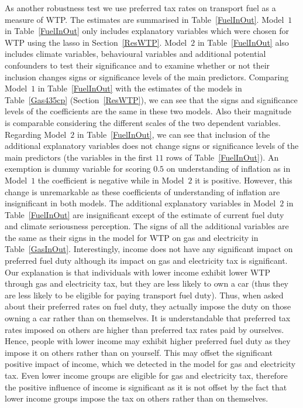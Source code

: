 \documentclass[a4paper,12pt]{article}
\begin{document}
As another robustness test we use preferred tax rates on transport fuel as a measure of WTP. The estimates are summarised in Table~\ref{FuelInOut}. Model~$1$ in Table~\ref{FuelInOut} only includes explanatory variables which were chosen for WTP using the lasso in Section~\ref{ResWTP}. Model~$2$ in Table~\ref{FuelInOut} also includes climate variables, behavioural variables and additional potential confounders to test their significance and to examine whether or not their inclusion changes signs or significance levels of the main predictors. Comparing Model~$1$ in Table~\ref{FuelInOut} with the estimates of the models in Table~\ref{Gas435cp} (Section~\ref{ResWTP}), we can see that the signs and significance levels of the coefficients are the same in these two models. Also their magnitude is comparable considering the different scales of the two dependent variables. Regarding Model~$2$ in Table~\ref{FuelInOut}, we can see that inclusion of the additional explanatory variables does not change signs or significance levels of the main predictors (the variables in the first $11$ rows of Table~\ref{FuelInOut}). An exemption is dummy variable for scoring $0.5$ on understanding of inflation as in Model~$1$ the coefficient is negative while in Model~$2$ it is positive. However, this change is unremarkable as these coefficients of understanding of inflation are insignificant in both models. The additional explanatory variables in Model~$2$ in Table~\ref{FuelInOut} are insignificant except of the estimate of current fuel duty and climate seriousness perception. The signs of all the additional variables are the same as their signs in the model for WTP on gas and electricity in Table~\ref{GasInOut}. Interestingly, income does not have any significant impact on preferred fuel duty although its impact on gas and electricity tax is significant. Our explanation is that individuals with lower income exhibit lower WTP through gas and electricity tax, but they are less likely to own a car (thus they are less likely to be eligible for paying transport fuel duty). Thus, when asked about their preferred rates on fuel duty, they actually impose the duty on those owning a car rather than on themselves. It is understandable that preferred tax rates imposed on others are higher than preferred tax rates paid by ourselves. Hence, people with lower income may exhibit higher preferred fuel duty as they impose it on others rather than on yourself. This may offset the significant positive impact of income, which we detected in the model for gas and electricity tax. Even lower income groups are eligible for gas and electricity tax, therefore the positive influence of income is significant as it is not offset by the fact that lower income groups impose the tax on others rather than on themselves.  
\end{document}
